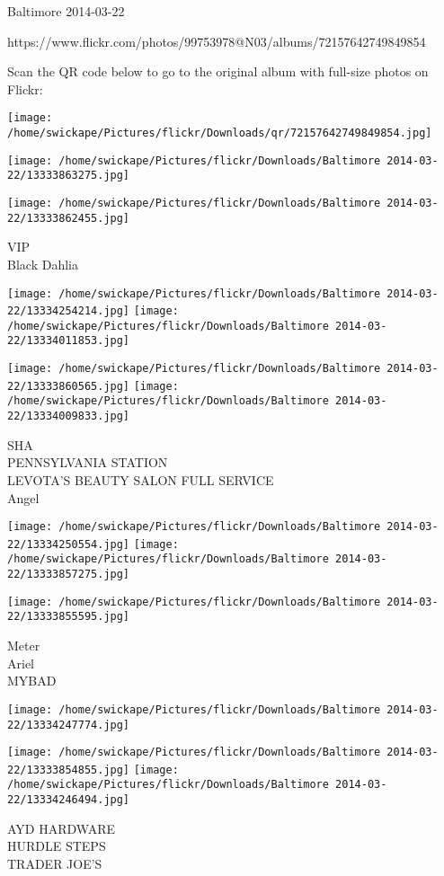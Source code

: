 \documentclass[10pt,letterpaper]{article}
\begin{document}
Baltimore 2014-03-22

https://www.flickr.com/photos/99753978@N03/albums/72157642749849854

Scan the QR code below to go to the original album with full-size photos on Flickr:

\texttt{[image: /home/swickape/Pictures/flickr/Downloads/qr/72157642749849854.jpg]}
\pagebreak

\texttt{[image: /home/swickape/Pictures/flickr/Downloads/Baltimore 2014-03-22/13333863275.jpg]}

\vspace{0.25in}
\texttt{[image: /home/swickape/Pictures/flickr/Downloads/Baltimore 2014-03-22/13333862455.jpg]}

VIP\\
Black Dahlia
\pagebreak

\texttt{[image: /home/swickape/Pictures/flickr/Downloads/Baltimore 2014-03-22/13334254214.jpg]}
\texttt{[image: /home/swickape/Pictures/flickr/Downloads/Baltimore 2014-03-22/13334011853.jpg]}

\texttt{[image: /home/swickape/Pictures/flickr/Downloads/Baltimore 2014-03-22/13333860565.jpg]}
\texttt{[image: /home/swickape/Pictures/flickr/Downloads/Baltimore 2014-03-22/13334009833.jpg]}

SHA\\
PENNSYLVANIA STATION\\
LEVOTA'S BEAUTY SALON FULL SERVICE\\
Angel
\pagebreak

\texttt{[image: /home/swickape/Pictures/flickr/Downloads/Baltimore 2014-03-22/13334250554.jpg]}
\texttt{[image: /home/swickape/Pictures/flickr/Downloads/Baltimore 2014-03-22/13333857275.jpg]}

\texttt{[image: /home/swickape/Pictures/flickr/Downloads/Baltimore 2014-03-22/13333855595.jpg]}

Meter\\
Ariel\\
MYBAD
\pagebreak

\texttt{[image: /home/swickape/Pictures/flickr/Downloads/Baltimore 2014-03-22/13334247774.jpg]}

\vspace{0.25in}
\texttt{[image: /home/swickape/Pictures/flickr/Downloads/Baltimore 2014-03-22/13333854855.jpg]}
\texttt{[image: /home/swickape/Pictures/flickr/Downloads/Baltimore 2014-03-22/13334246494.jpg]}

AYD HARDWARE\\
HURDLE STEPS\\
TRADER JOE'S
\pagebreak
\end{document}
